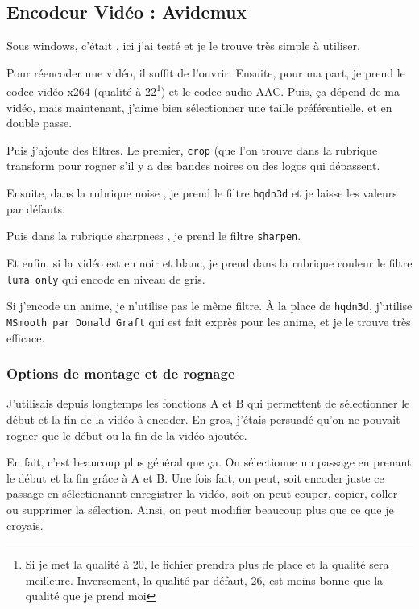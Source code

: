 \documentclass[a4paper,twoside]{article}
\begin{document}
\subsection{Encodeur Vidéo : Avidemux}
Sous windows, c'était , ici j'ai testé  et je le trouve très simple à utiliser.

Pour réencoder une vidéo, il suffit de l'ouvrir. Ensuite, pour ma part, je prend le codec vidéo x264 (qualité à 22\footnote{Si je met la qualité à 20, le fichier prendra plus de place et la qualité sera meilleure. Inversement, la qualité par défaut, 26, est moins bonne que la qualité que je prend moi}) et le codec audio AAC. Puis, ça dépend de ma vidéo, mais maintenant, j'aime bien sélectionner une taille préférentielle, et en double passe.

\bigskip

Puis j'ajoute des filtres. Le premier, \texttt{crop} (que l'on trouve dans la rubrique \og transform \fg    pour rogner s'il y a des bandes noires ou des logos qui dépassent.

Ensuite, dans la rubrique \og noise \fg,  je prend le filtre \texttt{hqdn3d} et je laisse les valeurs par défauts.

Puis dans la rubrique \og sharpness \fg, je prend le filtre \texttt{sharpen}.

Et enfin, si la vidéo est en noir et blanc, je prend dans la rubrique \og couleur \fg   le filtre \texttt{luma only} qui encode en niveau de gris.

Si j'encode un anime, je n'utilise pas le même filtre. À la place de \texttt{hqdn3d}, j'utilise \texttt{MSmooth par Donald Graft} qui est fait exprès pour les anime, et je le trouve très efficace.

\subsubsection{Options de montage et de rognage}
J'utilisais depuis longtemps les fonctions A et B qui permettent de sélectionner le début et la fin de la vidéo à encoder. En gros, j'étais persuadé qu'on ne pouvait rogner que le début ou la fin de la vidéo ajoutée.

En fait, c'est beaucoup plus général que ça. On sélectionne un passage en prenant le début et la fin grâce à A et B. Une fois fait, on peut, soit encoder juste ce passage en sélectionannt \og enregistrer la vidéo\fg, soit on peut couper, copier, coller ou supprimer la sélection. Ainsi, on peut modifier beaucoup plus que ce que je croyais.
\end{document}
